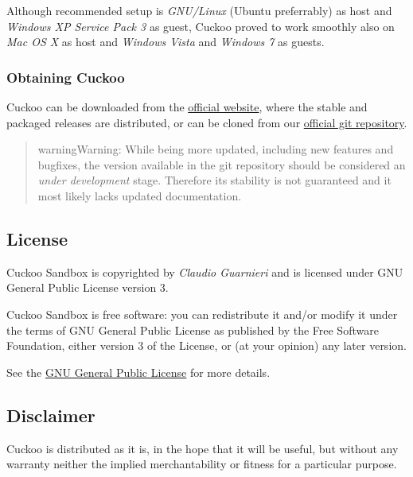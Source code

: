 \documentclass[letterpaper,10pt,english]{sphinxmanual}
\begin{document}
Although recommended setup is \emph{GNU/Linux} (Ubuntu preferrably) as host and
\emph{Windows XP Service Pack 3} as guest, Cuckoo proved to work smoothly also on
\emph{Mac OS X} as host and \emph{Windows Vista} and \emph{Windows 7} as guests.


\subsubsection{Obtaining Cuckoo}
\label{introduction/what:obtaining-cuckoo}
Cuckoo can be downloaded from the \href{http://www.cuckoobox.org}{official website}, where the stable and
packaged releases are distributed, or can be cloned from our \href{http://github.com/cuckoobox/cuckoo}{official git
repository}.
\begin{quote}

\begin{notice}{warning}{Warning:}
While being more updated, including new features and bugfixes, the
version available in the git repository should be considered an
\emph{under development} stage. Therefore its stability is not guaranteed
and it most likely lacks updated documentation.
\end{notice}
\end{quote}


\subsection{License}
\label{introduction/license:official-git-repository}\label{introduction/license::doc}\label{introduction/license:license}
Cuckoo Sandbox is copyrighted by \emph{Claudio Guarnieri} and is licensed under GNU
General Public License version 3.

Cuckoo Sandbox is free software: you can redistribute it and/or modify
it under the terms of GNU General Public License as published by the Free
Software Foundation, either version 3 of the License, or (at your opinion) any
later version.

See the \href{http://www.gnu.org/licenses/gpl.txt}{GNU General Public License} for more details.


\subsection{Disclaimer}
\label{introduction/license:gnu-general-public-license}\label{introduction/license:disclaimer}
Cuckoo is distributed as it is, in the hope that it will be useful, but without
any warranty neither the implied merchantability or fitness for a particular
purpose.
\end{document}
